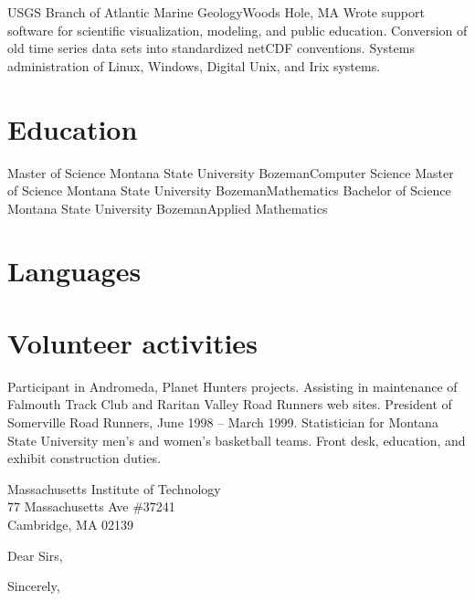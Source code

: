 \documentclass[11pt]{moderncv}  %
\begin{document}
    {USGS Branch of Atlantic Marine Geology}{Woods Hole, MA}{}{
    Wrote support software for scientific visualization, modeling,
    and public education. Conversion of old time series data sets
    into standardized netCDF conventions.  Systems administration
    of Linux, Windows, Digital Unix, and Irix systems.}

\section{Education}
    {Master of Science}
    {Montana State University}
    {Bozeman}{}{Computer Science}
    {Master of Science}
    {Montana State University}
    {Bozeman}{}{Mathematics}
    {Bachelor of Science}
    {Montana State University}
    {Bozeman}{}{Applied Mathematics}

\section{Languages}

\section{Volunteer activities}
  {Participant in Andromeda, Planet Hunters projects.}
  {Assisting in maintenance of Falmouth Track Club and Raritan Valley
   Road Runners web sites.
   President of Somerville Road Runners, June 1998 -- March 1999.}
  {Statistician for Montana State University men's and women's basketball
  teams.}
  {Front desk, education, and exhibit construction duties.}

\clearpage
{Massachusetts Institute of Technology\\77 Massachusetts Ave \#37241\\Cambridge, MA  02139}
\opening{Dear Sirs,}
\closing{Sincerely,}
\end{document}
